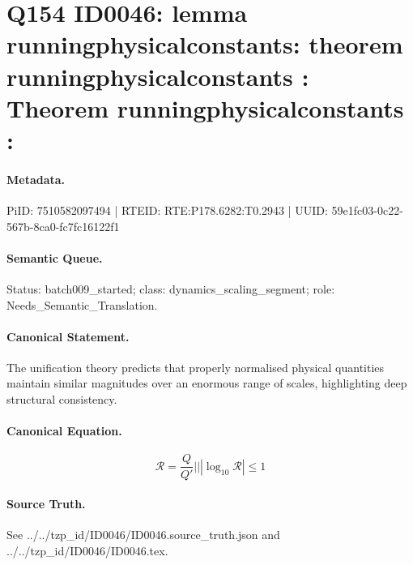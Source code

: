 \section*{Q154 ID0046: lemma runningphysicalconstants: theorem runningphysicalconstants : Theorem runningphysicalconstants :}
\paragraph{Metadata.}
PiID: 7510582097494 | RTEID: RTE:P178.6282:T0.2943 | UUID: 59e1fc03-0c22-567b-8ca0-fc7fc16122f1

\paragraph{Semantic Queue.}
Status: batch009\_started; class: dynamics\_scaling\_segment; role: Needs\_Semantic\_Translation.

\paragraph{Canonical Statement.}
The unification theory predicts that properly normalised physical quantities maintain similar magnitudes over an enormous range of scales, highlighting deep structural consistency.

\paragraph{Canonical Equation.}
\[
\mathcal{R} = \frac{Q}{Q'} || \left|\log_{10}\mathcal{R}\right| \leq 1
\]

\paragraph{Source Truth.}
See ../../tzp\_id/ID0046/ID0046.source\_truth.json and ../../tzp\_id/ID0046/ID0046.tex.

